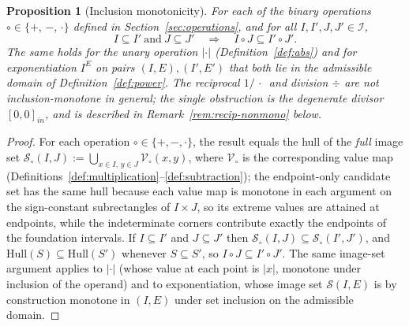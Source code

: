 \documentclass[11pt,a4paper]{article}
\theoremstyle{paperdef}
\newtheorem{proposition}[theorem]{Proposition}
\newcommand{\Iset}{\mathcal{I}}
\newcommand{\inI}[1]{[#1]_{in}}
\newcommand{\V}{\mathcal{V}}
\begin{document}
\begin{proposition}[Inclusion monotonicity]\label{prop:monotone}
For each of the binary operations $\circ \in \{+,\, -,\, \cdot\}$
defined in Section~\ref{sec:operations}, and for all
$I, I', J, J' \in \Iset$,
\[
I \subseteq I' \ \text{and}\ J \subseteq J'
\quad\Longrightarrow\quad I \circ J \subseteq I' \circ J'.
\]
The same holds for the unary operation $|\cdot|$
(Definition~\ref{def:abs}) and for exponentiation $I^E$ on pairs
$(I, E), (I', E')$ that both lie in the admissible domain of
Definition~\ref{def:power}. The reciprocal $1/\,\cdot\,$ and division
$\div$ are \emph{not} inclusion-monotone in general; the single
obstruction is the degenerate divisor $\inI{0,0}$, and is described in
Remark~\ref{rem:recip-nonmono} below.
\end{proposition}

\begin{proof}
For each operation $\circ \in \{+, -, \cdot\}$, the result equals the
hull of the \emph{full} image set
$\mathcal{S}_{\circ}(I, J) := \bigcup_{x \in I,\, y \in J}
\V_{\circ}(x, y)$, where $\V_{\circ}$ is the corresponding value map
(Definitions~\ref{def:multiplication}--\ref{def:subtraction}); the
endpoint-only candidate set has the same hull because each value map is
monotone in each argument on the sign-constant subrectangles of
$I \times J$, so its extreme values are attained at endpoints, while
the indeterminate corners contribute exactly the endpoints of the
foundation intervals. If $I \subseteq I'$ and $J \subseteq J'$ then
$\mathcal{S}_{\circ}(I, J) \subseteq \mathcal{S}_{\circ}(I', J')$, and
$\mathrm{Hull}(S) \subseteq \mathrm{Hull}(S')$ whenever
$S \subseteq S'$, so $I \circ J \subseteq I' \circ J'$. The same image-set
argument applies to $|\cdot|$ (whose value at each point is
$\lvert x \rvert$, monotone under inclusion of the operand) and to
exponentiation, whose image set $\mathcal{S}(I, E)$ is by construction
monotone in $(I, E)$ under set inclusion on the admissible domain.
\end{proof}
\end{document}
